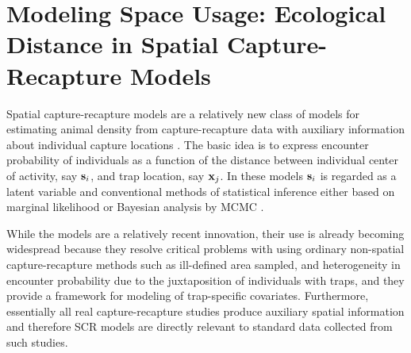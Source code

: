 \chapter{
Modeling Space Usage: Ecological Distance in Spatial Capture-Recapture Models
}
\label{chapt.ecoldist}


\vspace{.3in}

Spatial capture-recapture models are a relatively new class of models
for estimating animal density from capture-recapture data with
auxiliary information about individual capture locations
\citep{efford:2004,borchers_efford:2008, royle_young:2008, efford_etal:2009,
  royle_etal:2009ecol}.
The basic idea is to express encounter probability of
individuals as a function of the distance between individual center of
activity, say ${\bf s}_{i}$, and trap location, say ${\bf x}_{j}$.  
In these models ${\bf s}_{i}$ is regarded as a latent variable and
conventional methods of statistical inference either based on marginal
likelihood \citep{borchers_efford:2008} or Bayesian analysis by MCMC
\citep{royle_young:2008}.

While the models are a relatively recent innovation, their use is
already becoming widespread \citep{efford_etal:2009,
  gardner_etal:2010jwm, gardner_etal:2010ecol,kery_etal:2010, 
  borchers:2011,gopalaswamy_etal:2012, foster_harmsen:2012} because they resolve
critical problems with using ordinary non-spatial capture-recapture
methods such as ill-defined area sampled, and heterogeneity in
encounter probability due to the juxtaposition of individuals with
traps, and they provide a framework for modeling of trap-specific
covariates.  Furthermore, essentially all real capture-recapture
studies produce auxiliary spatial information and therefore SCR models
are directly relevant to standard data collected from such studies.

